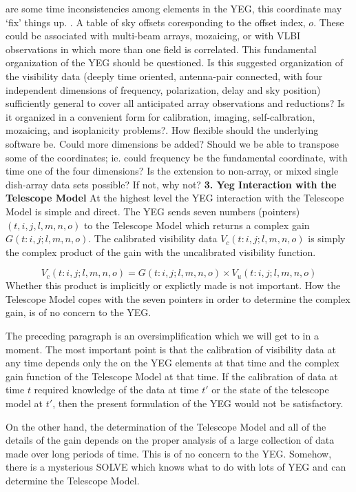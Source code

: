 are some time inconsistencies among elements in the YEG, this
coordinate may `fix' things up.
.  A table of sky offsets coresponding to the offset index, $o$.
These could be associated with multi-beam arrays, mozaicing, or with
VLBI observations in which more than one field is correlated.
\m
This fundamental organization of the YEG should be questioned.  Is
this suggested organization of the visibility data (deeply time
oriented, antenna-pair connected, with four independent dimensions of
frequency, polarization, delay and sky position) sufficiently general
to cover all anticipated array observations and reductions?  Is it
organized in a convenient form for calibration, imaging,
self-calbration, mozaicing, and isoplanicity problems?.  How flexible
should the underlying software be.  Could more dimensions be added?
Should we be able to transpose some of the coordinates; ie. could
frequency be the fundamental coordinate, with time one of the four
dimensions?  Is the extension to non-array, or mixed single dish-array
data sets possible?  If not, why not?
\bn
{\bf 3. Yeg Interaction with the Telescope Model}
\m
At the highest level the YEG interaction with the Telescope Model is
simple and direct.  The YEG sends seven numbers (pointers)
$(t,i,j,l,m,n,o)$ to the Telescope Model which returns a complex
gain $G(t:i,j;l,m,n,o)$.  The calibrated visibility data
$V_c(t:i,j;l,m,n,o)$ is simply the complex product of the gain with
the uncalibrated visibility function.

$$  V_c(t:i,j;l,m,n,o) = G(t:i,j;l,m,n,o) \times V_u(t:i,j;l,m,n,o) $$
\mn
Whether this product is implicitly or explictly made is not important.
How the Telescope Model copes with the seven pointers in order to
determine the complex gain, is of no concern to the YEG.

The preceding paragraph is an oversimplification which we will get to
in a moment.  The most important point is that the calibration of
visibility data at any time depends only the on the YEG elements at
that time and the complex gain function of the Telescope Model at that
time.  If the calibration of data at time $t$ required knowledge of
the data at time $t'$ or the state of the telescope model at $t'$,
then the present formulation of the YEG would not be satisfactory.

On the other hand, the determination of the Telescope Model and all of
the details of the gain depends on the proper analysis of a
large collection of data made over long periods of time.  This is of
no concern to the YEG.  Somehow, there is a mysterious SOLVE which
knows what to do with lots of YEG and can determine the Telescope
Model.

